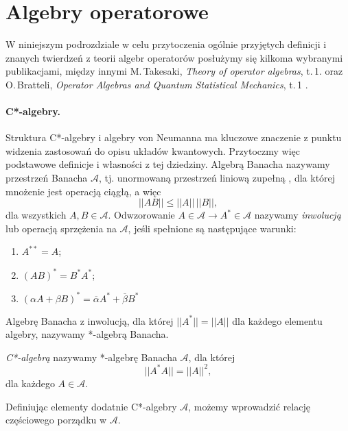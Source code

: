 \section{Algebry operatorowe}
W niniejszym podrozdziale w celu przytoczenia ogólnie przyjętych definicji
i znanych twierdzeń z teorii algebr operatorów posłużymy się kilkoma wybranymi
publikacjami, między innymi
M.\,Takesaki, \emph{Theory of operator algebras}, t.\,1. \cite{Takesaki1} oraz
O.\,Bratteli, \emph{Operator Algebras and Quantum Statistical Mechanics}, t.\,1
\cite{Bratteli2003}.

\paragraph{C*-algebry.}
Struktura C*-algebry i algebry von Neumanna ma kluczowe znaczenie z punktu widzenia
zastosowań do opisu układów kwantowych.
Przytoczmy więc podstawowe definicje i własności z tej dziedziny.
Algebrą Banacha nazywamy przestrzeń Banacha $\mathcal{A}$,
tj. unormowaną przestrzeń
liniową zupełną \cite{Rudin1991}, dla której mnożenie jest
operacją ciągłą, a więc
\begin{equation}
 \label{eq:algBanachMultiplication}
|| A B || \leq ||A|| \, ||B||,
\end{equation}
dla wszystkich $A, B \in \mathcal{A}$.
Odwzorowanie $A \in \mathcal{A} \rightarrow A^{*} \in \mathcal{A}$ nazywamy
\emph{inwolucją}  lub
operacją sprzężenia na $\mathcal{A}$, jeśli spełnione są następujące warunki:
\begin{enumerate}
 \item $A^{**} = A$;
 \item $(AB)^{*} = B^{*} A^{*}$;
 \item $(\alpha A + \beta B)^{*} = %
  \overline{\alpha} A^{*} + \overline{\beta} B^{*}$
\end{enumerate}
Algebrę Banacha z inwolucją, dla której
$||A^{*}|| = ||A||$ dla każdego elementu
algebry, nazywamy *-algebrą Banacha.


\begin{Definition}
 \label{def:c*alg}
  \emph{C*-algebrą} nazywamy *-algebrę Banacha $\mathcal{A}$, dla której
\begin{equation}
 || A^{*} A || = ||A||^{2},
\end{equation}
dla każdego $A \in \mathcal{A}$.
\end{Definition}

Definiując elementy dodatnie C*-algebry $\mathcal{A}$,
możemy wprowadzić relację częściowego porządku w $\mathcal{A}$.

